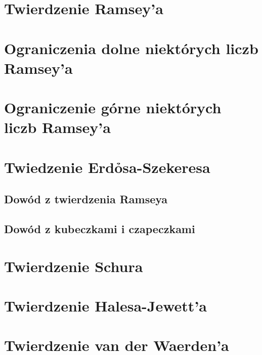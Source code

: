\section{Twierdzenie Ramsey'a}


\section{Ograniczenia dolne niektórych liczb Ramsey'a}


\section{Ograniczenie górne niektórych liczb Ramsey'a}


\section{Twiedzenie Erd\h{o}sa-Szekeresa}
\subsection{Dowód z twierdzenia Ramseya}


\subsection{Dowód z kubeczkami i czapeczkami}


\section{Twierdzenie Schura}


\section{Twierdzenie Halesa-Jewett'a}


\section{Twierdzenie van der Waerden'a}


